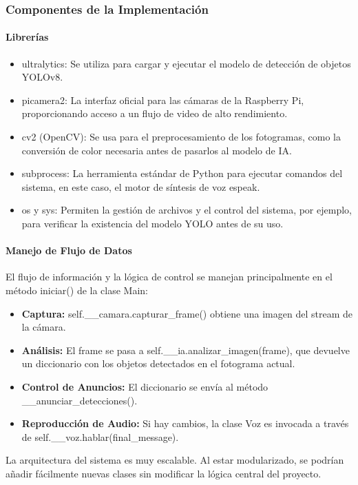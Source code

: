 \documentclass[12pt,a4paper]{article}
\begin{document}
\subsubsection{Componentes de la Implementación}
\paragraph{Librerías}
\begin{itemize}
\item ultralytics: Se utiliza para cargar y ejecutar el modelo de detección de objetos YOLOv8.
\item picamera2: La interfaz oficial para las cámaras de la Raspberry Pi, proporcionando acceso a un flujo de video de alto rendimiento.
\item cv2 (OpenCV): Se usa para el preprocesamiento de los fotogramas, como la conversión de color necesaria antes de pasarlos al modelo de IA.
\item subprocess: La herramienta estándar de Python para ejecutar comandos del sistema, en este caso, el motor de síntesis de voz espeak.
\item os y sys: Permiten la gestión de archivos y el control del sistema, por ejemplo, para verificar la existencia del modelo YOLO antes de su uso.
\end{itemize}

\paragraph{Manejo de Flujo de Datos}
El flujo de información y la lógica de control se manejan principalmente en el método iniciar() de la clase Main:
\begin{itemize}
\item \textbf{Captura:} self.\_\_camara.capturar\_frame() obtiene una imagen del stream de la cámara.
\item \textbf{Análisis:} El frame se pasa a self.\_\_ia.analizar\_imagen(frame), que devuelve un diccionario con los objetos detectados en el fotograma actual.
\item \textbf{Control de Anuncios:} El diccionario se envía al método \_\_anunciar\_detecciones().
\item \textbf{Reproducción de Audio:} Si hay cambios, la clase Voz es invocada a través de self.\_\_voz.hablar(final\_message).
\end{itemize}
La arquitectura del sistema es muy escalable. Al estar modularizado, se podrían añadir fácilmente nuevas clases sin modificar la lógica central del proyecto.
\end{document}
